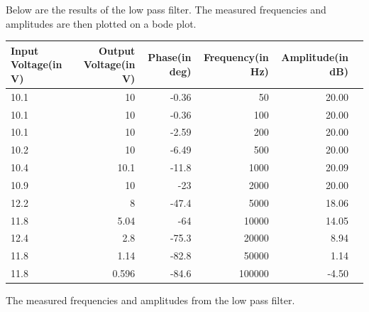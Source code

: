 Below are the results of the low pass filter. The measured frequencies and amplitudes are then plotted on a bode plot.

\begin{adjustwidth}{-2.5 cm}{-2.5 cm}\centering\begin{threeparttable}[!htb]
        \scriptsize
        \begin{tabular}{lrrrrr}\toprule
            \textbf{Input Voltage(in V)} & \textbf{Output Voltage(in V)} & \textbf{Phase(in deg)} & \textbf{Frequency(in Hz)} & \textbf{Amplitude(in dB)} \\\midrule
            10.1                         & 10                            & -0.36                  & 50                        & 20.00                     \\
            10.1                         & 10                            & -0.36                  & 100                       & 20.00                     \\
            10.1                         & 10                            & -2.59                  & 200                       & 20.00                     \\
            10.2                         & 10                            & -6.49                  & 500                       & 20.00                     \\
            10.4                         & 10.1                          & -11.8                  & 1000                      & 20.09                     \\
            10.9                         & 10                            & -23                    & 2000                      & 20.00                     \\
            12.2                         & 8                             & -47.4                  & 5000                      & 18.06                     \\
            11.8                         & 5.04                          & -64                    & 10000                     & 14.05                     \\
            12.4                         & 2.8                           & -75.3                  & 20000                     & 8.94                      \\
            11.8                         & 1.14                          & -82.8                  & 50000                     & 1.14                      \\
            11.8                         & 0.596                         & -84.6                  & 100000                    & -4.50                     \\
            \bottomrule
        \end{tabular}
        \caption{The measured frequencies and amplitudes from the low pass filter.}\label{tab: }
    \end{threeparttable}\end{adjustwidth}


